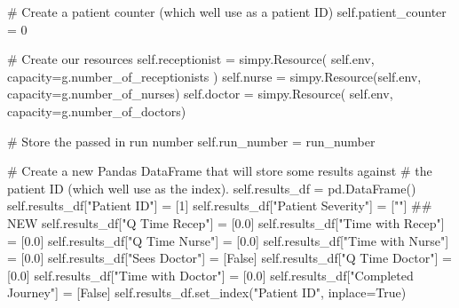 \documentclass[
  letterpaper,
  DIV=11,
  numbers=noendperiod]{scrreprt}
\newenvironment{Shaded}{}{}
\newcommand{\CommentTok}[1]{\textcolor[rgb]{0.42,0.45,0.49}{#1}}
\newcommand{\DecValTok}[1]{\textcolor[rgb]{0.00,0.36,0.77}{#1}}
\newcommand{\FloatTok}[1]{\textcolor[rgb]{0.00,0.36,0.77}{#1}}
\newcommand{\NormalTok}[1]{\textcolor[rgb]{0.14,0.16,0.18}{#1}}
\newcommand{\OperatorTok}[1]{\textcolor[rgb]{0.14,0.16,0.18}{#1}}
\newcommand{\StringTok}[1]{\textcolor[rgb]{0.01,0.18,0.38}{#1}}
\newcommand{\VariableTok}[1]{\textcolor[rgb]{0.89,0.38,0.04}{#1}}
\newcommand*\circled[1]{\tikz[baseline=(char.base)]{
          \node[shape=circle,draw,inner sep=1pt] (char) {{\scriptsize#1}};}}
\begin{document}
\begin{tcolorbox}
\begin{Shaded}
\begin{Highlighting}[]
        \CommentTok{\# Create a patient counter (which we\textquotesingle{}ll use as a patient ID)}
        \VariableTok{self}\NormalTok{.patient\_counter }\OperatorTok{=} \DecValTok{0}

        \CommentTok{\# Create our resources}
        \VariableTok{self}\NormalTok{.receptionist }\OperatorTok{=}\NormalTok{ simpy.Resource(}
            \VariableTok{self}\NormalTok{.env, capacity}\OperatorTok{=}\NormalTok{g.number\_of\_receptionists}
\NormalTok{        )}
        \VariableTok{self}\NormalTok{.nurse }\OperatorTok{=}\NormalTok{ simpy.Resource(}\VariableTok{self}\NormalTok{.env, capacity}\OperatorTok{=}\NormalTok{g.number\_of\_nurses)}
        \VariableTok{self}\NormalTok{.doctor }\OperatorTok{=}\NormalTok{ simpy.Resource(}
            \VariableTok{self}\NormalTok{.env, capacity}\OperatorTok{=}\NormalTok{g.number\_of\_doctors)}

        \CommentTok{\# Store the passed in run number}
        \VariableTok{self}\NormalTok{.run\_number }\OperatorTok{=}\NormalTok{ run\_number}

        \CommentTok{\# Create a new Pandas DataFrame that will store some results against}
        \CommentTok{\# the patient ID (which we\textquotesingle{}ll use as the index).}
        \VariableTok{self}\NormalTok{.results\_df }\OperatorTok{=}\NormalTok{ pd.DataFrame()}
        \VariableTok{self}\NormalTok{.results\_df[}\StringTok{"Patient ID"}\NormalTok{] }\OperatorTok{=}\NormalTok{ [}\DecValTok{1}\NormalTok{]}
        \VariableTok{self}\NormalTok{.results\_df[}\StringTok{"Patient Severity"}\NormalTok{] }\OperatorTok{=}\NormalTok{ [}\StringTok{""}\NormalTok{] }\CommentTok{\#\# NEW }\hspace*{\fill}\NormalTok{\circled{1}}
        \VariableTok{self}\NormalTok{.results\_df[}\StringTok{"Q Time Recep"}\NormalTok{] }\OperatorTok{=}\NormalTok{ [}\FloatTok{0.0}\NormalTok{]}
        \VariableTok{self}\NormalTok{.results\_df[}\StringTok{"Time with Recep"}\NormalTok{] }\OperatorTok{=}\NormalTok{ [}\FloatTok{0.0}\NormalTok{]}
        \VariableTok{self}\NormalTok{.results\_df[}\StringTok{"Q Time Nurse"}\NormalTok{] }\OperatorTok{=}\NormalTok{ [}\FloatTok{0.0}\NormalTok{]}
        \VariableTok{self}\NormalTok{.results\_df[}\StringTok{"Time with Nurse"}\NormalTok{] }\OperatorTok{=}\NormalTok{ [}\FloatTok{0.0}\NormalTok{]}
        \VariableTok{self}\NormalTok{.results\_df[}\StringTok{"Sees Doctor"}\NormalTok{] }\OperatorTok{=}\NormalTok{ [}\VariableTok{False}\NormalTok{]}
        \VariableTok{self}\NormalTok{.results\_df[}\StringTok{"Q Time Doctor"}\NormalTok{] }\OperatorTok{=}\NormalTok{ [}\FloatTok{0.0}\NormalTok{]}
        \VariableTok{self}\NormalTok{.results\_df[}\StringTok{"Time with Doctor"}\NormalTok{] }\OperatorTok{=}\NormalTok{ [}\FloatTok{0.0}\NormalTok{]}
        \VariableTok{self}\NormalTok{.results\_df[}\StringTok{"Completed Journey"}\NormalTok{] }\OperatorTok{=}\NormalTok{ [}\VariableTok{False}\NormalTok{]}
        \VariableTok{self}\NormalTok{.results\_df.set\_index(}\StringTok{"Patient ID"}\NormalTok{, inplace}\OperatorTok{=}\VariableTok{True}\NormalTok{)}


\end{Highlighting}
\end{Shaded}
\end{tcolorbox}
\end{document}
